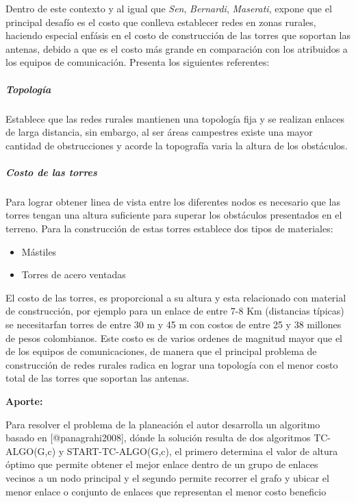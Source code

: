 \documentclass[]{article}
\providecommand{\tightlist}{%
  \setlength{\itemsep}{0pt}\setlength{\parskip}{0pt}}
\let\oldsubparagraph\subparagraph
\renewcommand{\subparagraph}[1]{\oldsubparagraph{#1}\mbox{}}
\begin{document}
Dentro de este contexto y al igual que \emph{Sen}, \emph{Bernardi},
\emph{Maserati}, expone que el principal desafío es el costo que
conlleva establecer redes en zonas rurales, haciendo especial enfásis en
el costo de construcción de las torres que soportan las antenas, debido
a que es el costo más grande en comparación con los atribuidos a los
equipos de comunicación. Presenta los siguientes referentes:

\subparagraph{Topología}\label{topologuxeda}

Establece que las redes rurales mantienen una topología fija y se
realizan enlaces de larga distancia, sin embargo, al ser áreas
campestres existe una mayor cantidad de obstrucciones y acorde la
topografía varia la altura de los obstáculos.

\subparagraph{Costo de las torres}\label{costo-de-las-torres}

Para lograr obtener linea de vista entre los diferentes nodos es
necesario que las torres tengan una altura suficiente para superar los
obstáculos presentados en el terreno. Para la construcción de estas
torres establece dos tipos de materiales:

\begin{itemize}
\tightlist
\item
  Mástiles
\item
  Torres de acero ventadas
\end{itemize}

El costo de las torres, es proporcional a su altura y esta re­lacionado
con material de construcción, por ejemplo para un enlace de entre 7-8 Km
(distancias típicas) se necesitarfan torres de entre 30 m y 45 m con
costos de entre 25 y 38 millones de pesos colombianos. Este costo es de
varios ordenes de magnitud mayor que el de los equipos de
comunicaciones, de manera que el principal problema de construcción de
redes rurales radica en lograr una topología con el menor costo total de
las torres que soportan las antenas.

\textbf{Aporte:}

Para resolver el problema de la planeación el autor desarrolla un
algoritmo basado en {[}@panagrahi2008{]}, dónde la solución resulta de
dos algoritmos TC-ALGO(G,c) y START-TC-ALGO(G,c), el primero determina
el valor de altura óptimo que permite obtener el mejor enlace dentro de
un grupo de enlaces vecinos a un nodo principal y el segundo permite
recorrer el grafo y ubicar el menor enlace o conjunto de enlaces que
representan el menor costo beneficio
\end{document}
